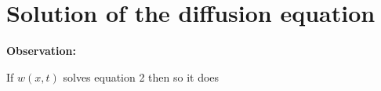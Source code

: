 
\section{Solution of the diffusion equation}\label{sec:solution_of_the_diffusion_equation} %
\textbf{Observation:}

If $w(x,t)$ solves equation 2 then so it does
